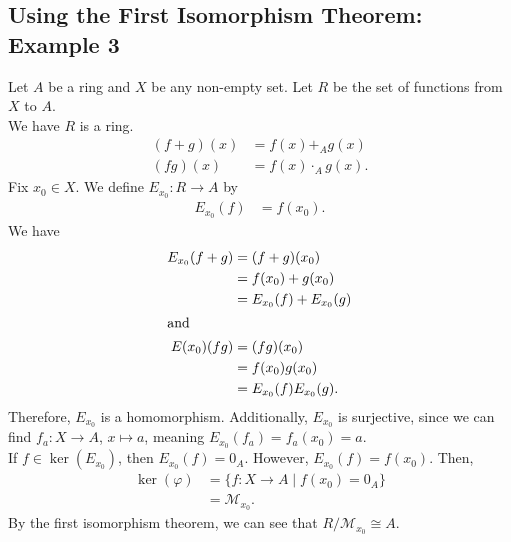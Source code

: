 \documentclass[8pt]{extarticle}
\begin{document}
  \subsection{Using the First Isomorphism Theorem: Example 3}%
  Let $A$ be a ring and $X$ be any non-empty set. Let $R$ be the set of functions from $X$ to $A$.\\

  We have $R$ is a ring.
  \begin{align*}
    (f+g)(x) &= f(x) +_{A} g(x)\\
    (fg)(x) &= f(x)\cdot_{A}g(x).
  \end{align*}
  Fix $x_0 \in X$. We define $E_{x_0}: R\rightarrow A$ by
  \begin{align*}
    E_{x_0}(f) &= f(x_0).
  \end{align*}
  We have
  \begin{align*}
    E_{x_0}(f+g) &= (f+g)(x_0)\\
                 &= f(x_0) + g(x_0)\\
                 &= E_{x_0}(f) + E_{x_0}(g)\\
                 \intertext{and}
    E(x_0)(fg) &= (fg)(x_0)\\
               &= f(x_0)g(x_0)\\
               &= E_{x_0}(f)E_{x_0}(g).
  \end{align*}
  Therefore, $E_{x_0}$ is a homomorphism. Additionally, $E_{x_0}$ is surjective, since we can find $f_a: X\rightarrow A$, $x\mapsto a$, meaning $E_{x_0}(f_a) = f_a(x_0) = a$.\\

  If $f\in \ker(E_{x_0})$, then $E_{x_0}(f) = 0_A$. However, $E_{x_0}(f) = f(x_0)$. Then,
  \begin{align*}
    \ker(\varphi) &= \{f: X\rightarrow A \mid f(x_0) = 0_A\}\\
                  &= \mathcal{M}_{x_0}.
  \end{align*}
  By the first isomorphism theorem, we can see that $R/\mathcal{M}_{x_0} \cong A$.
\end{document}
